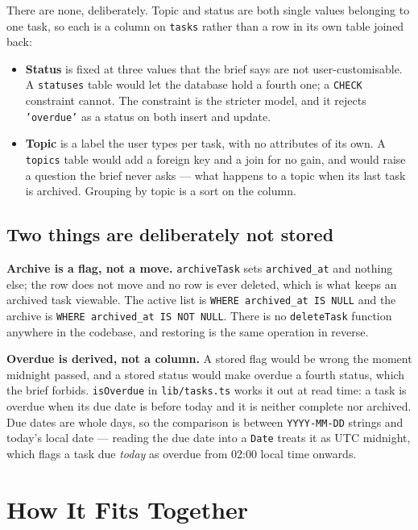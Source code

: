 \documentclass[11pt,a4paper]{article}
\begin{document}
There are none, deliberately. Topic and status are both single values belonging
to one task, so each is a column on \texttt{tasks} rather than a row in its own
table joined back:

\begin{itemize}[leftmargin=*]
  \item \textbf{Status} is fixed at three values that the brief says are not
    user-customisable. A \texttt{statuses} table would let the database hold a
    fourth one; a \texttt{CHECK} constraint cannot. The constraint is the
    stricter model, and it rejects \texttt{'overdue'} as a status on both insert
    and update.
  \item \textbf{Topic} is a label the user types per task, with no attributes of
    its own. A \texttt{topics} table would add a foreign key and a join for no
    gain, and would raise a question the brief never asks --- what happens to a
    topic when its last task is archived. Grouping by topic is a sort on the
    column.
\end{itemize}

\subsection{Two things are deliberately not stored}

\textbf{Archive is a flag, not a move.} \texttt{archiveTask} sets
\texttt{archived\_at} and nothing else; the row does not move and no row is ever
deleted, which is what keeps an archived task viewable. The active list is
\texttt{WHERE archived\_at IS NULL} and the archive is
\texttt{WHERE archived\_at IS NOT NULL}. There is no \texttt{deleteTask} function
anywhere in the codebase, and restoring is the same operation in reverse.

\textbf{Overdue is derived, not a column.} A stored flag would be wrong the
moment midnight passed, and a stored status would make overdue a fourth status,
which the brief forbids. \texttt{isOverdue} in \texttt{lib/tasks.ts} works it out
at read time: a task is overdue when its due date is before today and it is
neither complete nor archived. Due dates are whole days, so the comparison is
between \texttt{YYYY-MM-DD} strings and today's local date --- reading the due
date into a \texttt{Date} treats it as UTC midnight, which flags a task due
\emph{today} as overdue from 02:00 local time onwards.

\section{How It Fits Together}
\end{document}
